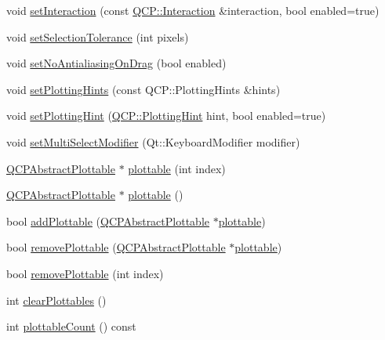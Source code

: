 \begin{DoxyCompactItemize}
\item 
void \hyperlink{class_q_custom_plot_a422bf1bc6d56dac75a3d805d9a65902c}{set\-Interaction} (const \hyperlink{namespace_q_c_p_a2ad6bb6281c7c2d593d4277b44c2b037}{Q\-C\-P\-::\-Interaction} \&interaction, bool enabled=true)
\item 
void \hyperlink{class_q_custom_plot_a4dc31241d7b09680950e19e5f971ed93}{set\-Selection\-Tolerance} (int pixels)
\item 
void \hyperlink{class_q_custom_plot_a775bdcb6329d44701aeaa6135b0e5265}{set\-No\-Antialiasing\-On\-Drag} (bool enabled)
\item 
void \hyperlink{class_q_custom_plot_a94a33cbdadbbac5934843508bcfc210d}{set\-Plotting\-Hints} (const Q\-C\-P\-::\-Plotting\-Hints \&hints)
\item 
void \hyperlink{class_q_custom_plot_a3b7c97bb6c16464e9e15190c07abe9a9}{set\-Plotting\-Hint} (\hyperlink{namespace_q_c_p_a5400e5fcb9528d92002ddb938c1f4ef4}{Q\-C\-P\-::\-Plotting\-Hint} hint, bool enabled=true)
\item 
void \hyperlink{class_q_custom_plot_a8fc96e3b5138a06759a2a90c166df516}{set\-Multi\-Select\-Modifier} (Qt\-::\-Keyboard\-Modifier modifier)
\item 
\hyperlink{class_q_c_p_abstract_plottable}{Q\-C\-P\-Abstract\-Plottable} $\ast$ \hyperlink{class_q_custom_plot_a32de81ff53e263e785b83b52ecd99d6f}{plottable} (int index)
\item 
\hyperlink{class_q_c_p_abstract_plottable}{Q\-C\-P\-Abstract\-Plottable} $\ast$ \hyperlink{class_q_custom_plot_adea38bdc660da9412ba69fb939031567}{plottable} ()
\item 
bool \hyperlink{class_q_custom_plot_ab7ad9174f701f9c6f64e378df77927a6}{add\-Plottable} (\hyperlink{class_q_c_p_abstract_plottable}{Q\-C\-P\-Abstract\-Plottable} $\ast$\hyperlink{class_q_custom_plot_a32de81ff53e263e785b83b52ecd99d6f}{plottable})
\item 
bool \hyperlink{class_q_custom_plot_af3dafd56884208474f311d6226513ab2}{remove\-Plottable} (\hyperlink{class_q_c_p_abstract_plottable}{Q\-C\-P\-Abstract\-Plottable} $\ast$\hyperlink{class_q_custom_plot_a32de81ff53e263e785b83b52ecd99d6f}{plottable})
\item 
bool \hyperlink{class_q_custom_plot_afc210e0021480f8119bccf37839dbcc8}{remove\-Plottable} (int index)
\item 
int \hyperlink{class_q_custom_plot_a9a409bb3201878adb7ffba1c89c4e004}{clear\-Plottables} ()
\item 
int \hyperlink{class_q_custom_plot_a2dbfbf15dc38713f9a1c445a3dd2e989}{plottable\-Count} () const 

\end{DoxyCompactItemize}
